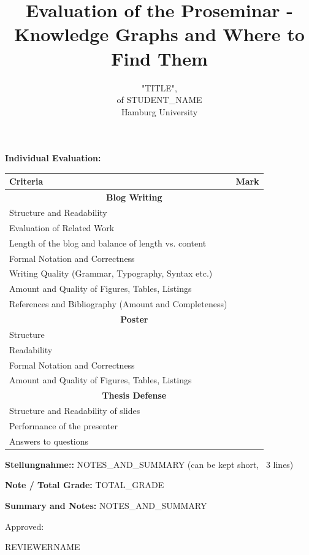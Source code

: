 \documentclass{scrartcl}
\title{Evaluation of the Proseminar -\\Knowledge Graphs and Where to Find Them}
\author{}
\subtitle{"TITLE", \\ of STUDENT\_NAME \\ Hamburg University}
\date{\vspace{-2cm}}
\begin{document}
\maketitle

\textbf{Individual Evaluation:}
\begin{table}[htb!]
\centering
\begin{tabular}{@{}ll@{}}
\toprule
\textbf{Criteria}                                      & \textbf{Mark} \\ \midrule
\multicolumn{2}{c}{\textbf{Blog Writing}}                             \\
Structure and Readability                              &               \\
Evaluation of Related Work                             &               \\
Length of the blog and balance of length vs. content &               \\
Formal Notation and Correctness                        &               \\
Writing Quality (Grammar, Typography, Syntax etc.)     &               \\
Amount and Quality of Figures, Tables, Listings        &               \\
References and Bibliography (Amount and Completeness)  &               \\
\multicolumn{2}{c}{\textbf{Poster}}                             \\
Structure                                              &               \\
Readability                                            &               \\
Formal Notation and Correctness                        &               \\
Amount and Quality of Figures, Tables, Listings        &               \\
\multicolumn{2}{c}{\textbf{Thesis Defense}}                             \\
Structure and Readability of slides                    &               \\
Performance of the presenter                           &               \\
Answers to questions                                   &               \\ \bottomrule
\end{tabular}
\end{table}

\textbf{Stellungnahme::} NOTES\_AND\_SUMMARY (can be kept short, ~3 lines)

\vspace{0.5cm}
\textbf{Note / Total Grade:} TOTAL\_GRADE


\vspace{0.5cm}
\textbf{Summary and Notes:} NOTES\_AND\_SUMMARY

\vspace{0.5cm}
Approved: \hrulefill

\hspace*{0mm}\phantom{Approved: } REVIEWERNAME
\end{document}
